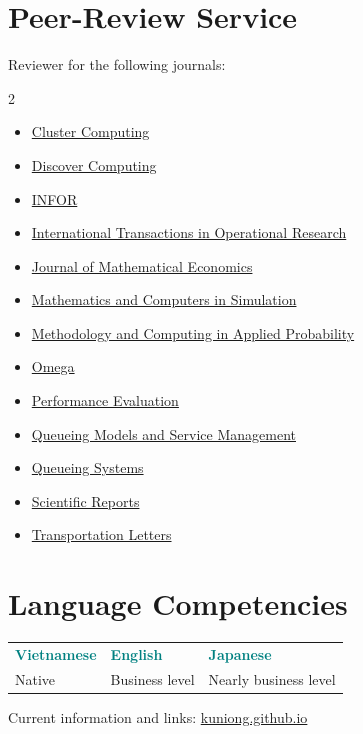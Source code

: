 \documentclass[10pt,a4paper]{article}
\begin{document}
\section{Peer-Review Service}
\small
Reviewer for the following journals:
\begin{multicols}{2}
\begin{itemize}[leftmargin=1.2em,itemsep=2pt,topsep=3pt]
  \item \href{https://link.springer.com/journal/10586}{Cluster Computing}
  \item \href{https://link.springer.com/journal/10791}{Discover Computing}
  \item \href{https://www.tandfonline.com/journals/tinf20}{INFOR}
  \item \href{https://onlinelibrary.wiley.com/journal/14753995}{International Transactions in Operational Research}
  \item \href{https://www.sciencedirect.com/journal/journal-of-mathematical-economics}{Journal of Mathematical Economics}
  \item \href{https://www.sciencedirect.com/journal/mathematics-and-computers-in-simulation}{Mathematics and Computers in Simulation}
  \item \href{https://link.springer.com/journal/11009}{Methodology and Computing in Applied Probability}
  \item \href{https://www.sciencedirect.com/journal/omega}{Omega}
  \item \href{https://www.sciencedirect.com/journal/performance-evaluation}{Performance Evaluation}
  \item \href{http://qmsm.nchu.edu.tw/index.php/qmsm}{Queueing Models and Service Management}
  \item \href{https://link.springer.com/journal/11134}{Queueing Systems}
  \item \href{https://www.nature.com/srep/}{Scientific Reports}
  \item \href{https://www.tandfonline.com/journals/ytrl20}{Transportation Letters}
\end{itemize}
\end{multicols}
\normalsize

\section{Language Competencies}
\begin{tabularx}{\textwidth}{@{}XXX@{}}
  \textbf{\textcolor{Teal}{Vietnamese}} &
  \textbf{\textcolor{Teal}{English}} &
  \textbf{\textcolor{Teal}{Japanese}} \\
  Native & Business level & Nearly business level
\end{tabularx}

\vfill
\begin{center}
  {\footnotesize\color{Muted}\sffamily Current information and links: \href{https://kuniong.github.io}{kuniong.github.io}}
\end{center}
\end{document}
